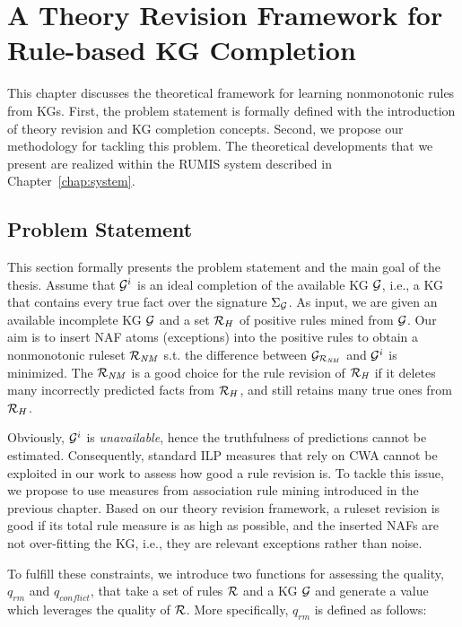 \chapter{A Theory Revision Framework for Rule-based KG Completion}
\label{chap:frame}

This chapter discusses the theoretical framework for learning nonmonotonic rules from KGs. First, the problem statement is formally defined with the introduction of theory revision and KG completion concepts. Second, we propose our methodology for tackling this problem. The theoretical developments that we present are realized within the RUMIS system described in Chapter~\ref{chap:system}.

\section{Problem Statement}

This section formally presents the problem statement and the main goal of the thesis. Assume that $\mathcal{G}^i$ is an ideal completion of the available KG $\mathcal{G}$, i.e., a KG that contains every true fact over the signature $\Sigma_{\mathcal{G}}$. As input, we are given an available incomplete KG $\mathcal{G}$ and a set $\mathcal{R}_H$ of positive rules mined from $\mathcal{G}$. Our aim is to insert NAF atoms (exceptions) into the positive rules to obtain a nonmonotonic ruleset $\mathcal{R}_{\mathit{NM}}$ s.t. the difference between $\mathcal{G}_{\mathcal{R}_{\mathit{NM}}}$ and $\mathcal{G}^i$ is minimized. The $\mathcal{R}_{\mathit{NM}}$ is a good choice for the rule revision of $\mathcal{R}_{\mathit{H}}$ if it deletes many incorrectly predicted facts from $\mathcal{R}_H$, and still retains many true ones from $\mathcal{R}_H$.

Obviously, $\mathcal{G}^i$ is \emph{unavailable}, hence the truthfulness of predictions cannot be estimated. Consequently, standard ILP measures that rely on CWA cannot be exploited in our work to assess how good a rule revision is. To tackle this issue, we propose to use measures from association rule mining introduced in the previous chapter. Based on our theory revision framework, a ruleset revision is good if its total rule measure is as high as possible, and the inserted NAFs are not over-fitting the KG, i.e., they are relevant exceptions rather than noise.

To fulfill these constraints, we introduce two functions for assessing the quality, $q_{rm}$ and $q_{conflict}$, that take a set of rules $\mathcal{R}$ and a KG $\mathcal{G}$ and generate a value which leverages the quality of $\mathcal{R}$. More specifically, $q_{rm}$ is defined as follows:

